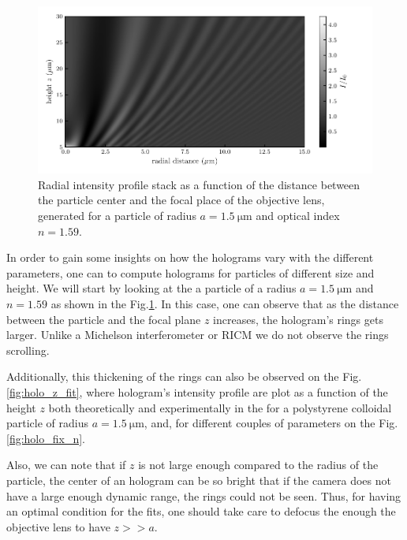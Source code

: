 \begin{figure}[H]
	\centering
	\includegraphics{02_body/chapter2/images/holo_size_exemple/holos_only_z.pdf}
	\caption{Radial intensity profile stack as a function of the distance between the particle center and the focal place of the objective lens, generated for a particle of radius $a = 1.5 ~\mathrm{\mu m}$ and optical index $n = 1.59$.}
	\label{fig:holo_onlyz}
\end{figure}

In order to gain some insights on how the holograms vary with the different parameters, one can to compute holograms for particles of different size and height. We will start by looking at the a particle of a radius $a = 1.5 ~ \mathrm{\mu m} $ and $n = 1.59 $ as shown in the Fig.\ref{fig:holo_onlyz}. In this case, one can observe that as the distance between the particle and the focal plane $z$ increases, the hologram's rings gets larger. Unlike a Michelson interferometer or \gls{RICM} we do not observe the rings scrolling. 

Additionally, this thickening of the rings can also be observed on the Fig.\ref{fig:holo_z_fit}, where hologram's intensity profile are plot as a function of the height $z$ both theoretically and experimentally in the for a polystyrene colloidal particle of radius  $a = 1.5 ~ \mathrm{\mu m} $, and, for different couples of parameters on the Fig.\ref{fig:holo_fix_n}.

Also, we can note that if $z$ is not large enough compared to the radius of the particle, the center of an hologram can be so bright that if the camera does not have a large enough dynamic range, the rings could not be seen.  Thus, for having an optimal condition for the fits, one should take care to defocus the enough the objective lens to have $z >> a$.

